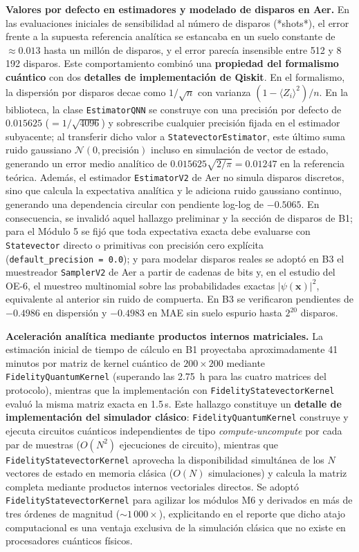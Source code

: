 \textbf{Valores por defecto en estimadores y modelado de disparos en Aer.} En las evaluaciones iniciales
de sensibilidad al número de disparos (*shots*), el error frente a la supuesta referencia analítica se estancaba en un suelo
constante de $\approx 0.013$ hasta un millón de disparos, y el error parecía insensible entre 512 y 8\,192 disparos.
Este comportamiento combinó una \textbf{propiedad del formalismo cuántico} con dos \textbf{detalles de implementación de Qiskit}.
En el formalismo, la dispersión por disparos decae como $1/\sqrt{n}$ con varianza $(1 - \langle Z_i \rangle^2)/n$. En la biblioteca,
la clase \texttt{EstimatorQNN} se construye con una precisión por defecto de $0.015625$ ($= 1/\sqrt{4096}$) y sobrescribe cualquier
precisión fijada en el estimador subyacente; al transferir dicho valor a \texttt{StatevectorEstimator}, este último suma ruido
gaussiano $\mathcal{N}(0, \text{precisión})$ incluso en simulación de vector de estado, generando un error medio analítico de
$0.015625 \sqrt{2/\pi} = 0.01247$ en la referencia teórica. Además, el estimador \texttt{EstimatorV2} de Aer no simula disparos
discretos, sino que calcula la expectativa analítica y le adiciona ruido gaussiano continuo, generando una dependencia circular
con pendiente log-log de $-0.5065$. En consecuencia, se invalidó aquel hallazgo preliminar y la sección de disparos de B1; para el Módulo 5 se fijó
que toda expectativa exacta debe evaluarse con \texttt{Statevector} directo o primitivas con precisión cero explícita (\texttt{default\_precision = 0.0});
y para modelar disparos reales se adoptó en B3 el muestreador \texttt{SamplerV2} de Aer a partir de cadenas de bits y, en el estudio
del OE-6, el muestreo multinomial sobre las probabilidades exactas $|\psi(\mathbf{x})|^2$, equivalente al anterior sin ruido de
compuerta. En B3 se verificaron pendientes de $-0.4986$ en dispersión y $-0.4983$ en MAE sin suelo espurio hasta $2^{20}$ disparos.

\textbf{Aceleración analítica mediante productos internos matriciales.} La estimación inicial de tiempo de cálculo
en B1 proyectaba aproximadamente 41 minutos por matriz de kernel cuántico de $200 \times 200$ mediante \texttt{FidelityQuantumKernel}
(superando las 2.75~h para las cuatro matrices del protocolo), mientras que la implementación con \texttt{FidelityStatevectorKernel}
evaluó la misma matriz exacta en 1.5\,s. Este hallazgo constituye un \textbf{detalle de implementación del simulador clásico}:
\texttt{FidelityQuantumKernel} construye y ejecuta circuitos cuánticos independientes de tipo \textit{compute-uncompute} por cada
par de muestras ($O(N^2)$ ejecuciones de circuito), mientras que \texttt{FidelityStatevectorKernel} aprovecha la disponibilidad
simultánea de los $N$ vectores de estado en memoria clásica ($O(N)$ simulaciones) y calcula la matriz completa mediante productos
internos vectoriales directos. Se adoptó \texttt{FidelityStatevectorKernel} para agilizar los módulos M6 y derivados en más de
tres órdenes de magnitud ($\sim 1\,000\times$), explicitando en el reporte que dicho atajo computacional es una ventaja
exclusiva de la simulación clásica que no existe en procesadores cuánticos físicos.

